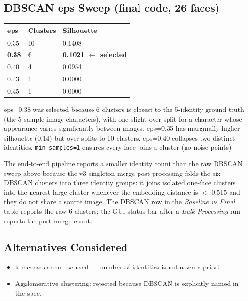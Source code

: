 \subsection{DBSCAN eps Sweep (final code, 26 faces)}
\noindent
\begin{tabular}{@{}lll@{}}
\toprule
\textbf{eps} & \textbf{Clusters} & \textbf{Silhouette}~\citep{rousseeuw1987silhouettes} \\
\midrule
0.35           & 10 & 0.1408 \\
\textbf{0.38}  & \textbf{6}  & \textbf{0.1021 $\leftarrow$ selected} \\
0.40           & 4  & 0.0954 \\
0.43           & 1  & 0.0000 \\
0.45           & 1  & 0.0000 \\
\bottomrule
\end{tabular}

\smallskip
eps=0.38 was selected because 6 clusters is closest to the 5-identity ground
truth (the 5 sample-image characters), with one slight over-split for a
character whose appearance varies significantly between images. eps=0.35 has
marginally higher silhouette (0.14) but over-splits to 10 clusters. eps=0.40
collapses two distinct identities. \texttt{min\_samples=1} ensures every face
joins a cluster (no noise points).

The end-to-end pipeline reports a smaller identity count than the raw DBSCAN
sweep above because the v3 singleton-merge post-processing folds the six
DBSCAN clusters into three identity groups: it joins isolated one-face
clusters into the nearest large cluster whenever the embedding distance is
$<$ 0.515 and they do not share a source image. The DBSCAN row in the
\emph{Baseline vs Final} table reports the raw 6 clusters; the GUI status
bar after a \emph{Bulk Processing} run reports the post-merge count.

\subsection{Alternatives Considered}
\begin{itemize}
  \item k-means: cannot be used --- number of identities is unknown a priori.
  \item Agglomerative clustering: rejected because DBSCAN is explicitly named
        in the spec.
\end{itemize}

